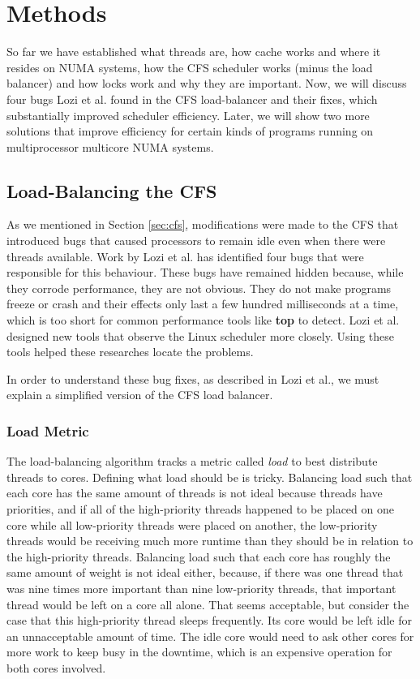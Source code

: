 \documentclass{sig-alternate}
\begin{document}
\section{Methods}
\label{sec:methods}

So far we have established what threads are, how cache works and where it resides on NUMA systems, how the CFS scheduler works (minus the load balancer) and how locks work and why they are important. Now, we will discuss four bugs Lozi et al. found in the CFS load-balancer and their fixes, which substantially improved scheduler efficiency. Later, we will show two more solutions that improve efficiency for certain kinds of programs running on multiprocessor multicore NUMA systems.

\subsection{Load-Balancing the CFS}
\label{sec:loadbalance}

As we mentioned in Section \ref{sec:cfs}, modifications were made to the CFS that introduced bugs that caused processors to remain idle even when there were threads available. Work by Lozi et al. has identified four bugs that were responsible for this behaviour. These bugs have remained hidden because, while they corrode performance, they are not obvious. They do not make programs freeze or crash and their effects only last a few hundred milliseconds at a time, which is too short for common performance tools like \textbf{top} to detect. Lozi et al. designed new tools that observe the Linux scheduler more closely. Using these tools helped these researches locate the problems.~\cite{Lozi:2016}

In order to understand these bug fixes, as described in Lozi et al., we must explain a simplified version of the CFS load balancer.~\cite{Lozi:2016}

\subsubsection{Load Metric}
\label{sec:loadmetric}

The load-balancing algorithm tracks a metric called \emph{load} to best distribute threads to cores. Defining what load should be is tricky. Balancing load such that each core has the same amount of threads is not ideal because threads have priorities, and if all of the high-priority threads happened to be placed on one core while all low-priority threads were placed on another, the low-priority threads would be receiving much more runtime than they should be in relation to the high-priority threads. Balancing load such that each core has roughly the same amount of weight is not ideal either, because, if there was one thread that was nine times more important than nine low-priority threads, that important thread would be left on a core all alone. That seems acceptable, but consider the case that this high-priority thread sleeps frequently. Its core would be left idle for an unnacceptable amount of time. The idle core would need to ask other cores for more work to keep busy in the downtime, which is an expensive operation for both cores involved.~\cite{Lozi:2016}
\end{document}
